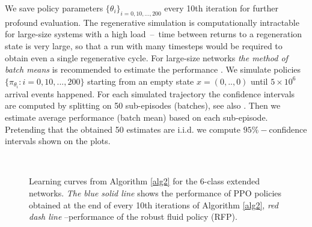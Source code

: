 \documentclass[11pt]{article}
\theoremstyle{definition}
\numberwithin{equation}{section}
\begin{document}
We save policy parameters $\{\theta_i\}_{i=0, 10, ..., 200}$ every 10th iteration for further profound evaluation. 
The regenerative simulation is computationally intractable for large-size systems with a high load~--~time between returns to a regeneration state is very large, so that a run with many timesteps would
be required to obtain even a single regenerative cycle. For large-size networks \textit{the method of batch
means}  is recommended to estimate the performance \cite[Section 6]{Henderson1997}.  We simulate   policies $\{    \pi_{\theta_i}: i = 0, 10, ..., 200 \}$  starting from an empty state $x = (0,..,0)$ until $5\times10^6$ arrival events happened.
For each simulated trajectory the  confidence intervals are computed by splitting  on 50 sub-episodes (batches), see also \cite{Nelson1989}. Then we estimate average performance (batch mean) based on each sub-episode. Pretending that the obtained 50 estimates are i.i.d. we compute  $95\%-$confidence intervals shown on the plots.
 


\begin{figure}[H]
     \\


\caption{Learning curves  from Algorithm \ref{alg2} for the 6-class extended networks.     \textit{The blue solid line} shows the performance of  PPO policies obtained at the end of every 10th iterations of Algorithm \ref{alg2},  \textit{red dash line} --performance of the robust fluid policy (RFP).}
     \label{fig:ext_ac}
   \end{figure}
\end{document}
